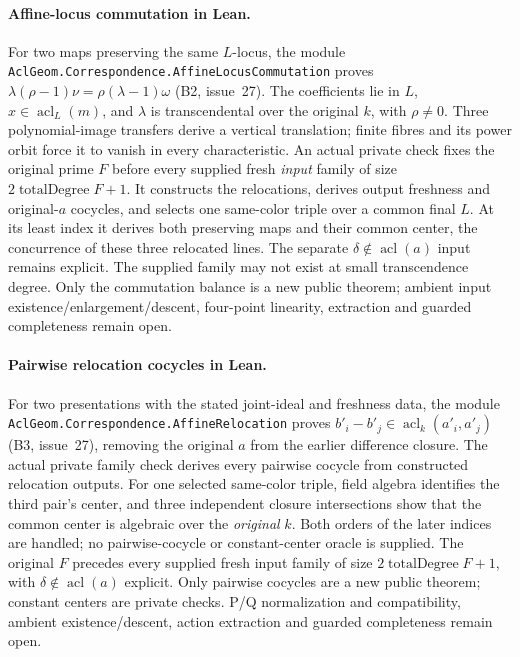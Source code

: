 \documentclass[11pt,oneside]{article}
\theoremstyle{definition}
\theoremstyle{remark}
\newcommand{\acl}{\operatorname{acl}}
\newcommand{\lean}[1]{\nolinkurl{#1}}
\begin{document}
\paragraph{Affine-locus commutation in Lean.}
For two maps preserving the same $L$-locus, the module
\lean{AclGeom.Correspondence.AffineLocusCommutation} proves
$\lambda(\rho-1)\nu=\rho(\lambda-1)\omega$ (B2, issue~27).
The coefficients lie in $L$, $x\in\acl_L(m)$, and $\lambda$ is
transcendental over the original $k$, with $\rho\ne0$.
Three polynomial-image transfers derive a vertical translation;
finite fibres and its power orbit force it to vanish in every characteristic.
An actual private check fixes the original prime $F$ before every
supplied fresh \emph{input} family of size $2\operatorname{totalDegree}F+1$.
It constructs the relocations, derives output freshness and original-$a$
cocycles, and selects one same-color triple over a common final $L$.
At its least index it derives both preserving maps and their common center,
the concurrence of these three relocated lines.
The separate $\delta\notin\acl(a)$ input remains explicit.
The supplied family may not exist at small transcendence degree.
Only the commutation balance is a new public theorem; ambient input
existence/enlargement/descent, four-point linearity, extraction and guarded
completeness remain open.

\paragraph{Pairwise relocation cocycles in Lean.}
For two presentations with the stated joint-ideal and freshness data, the
module \lean{AclGeom.Correspondence.AffineRelocation} proves
$b'_i-b'_j\in\acl_k(a'_i,a'_j)$ (B3, issue~27), removing the original $a$
from the earlier difference closure. The actual private family check
derives every pairwise cocycle from constructed relocation outputs.
For one selected same-color triple, field algebra identifies the third
pair's center, and three independent closure intersections show that the
common center is algebraic over the \emph{original} $k$.
Both orders of the later indices are handled; no pairwise-cocycle or
constant-center oracle is supplied. The original $F$ precedes every
supplied fresh input family of size $2\operatorname{totalDegree}F+1$,
with $\delta\notin\acl(a)$ explicit.
Only pairwise cocycles are a new public theorem; constant centers are
private checks. P/Q normalization and compatibility, ambient
existence/descent, action extraction and guarded completeness remain open.
\end{document}
